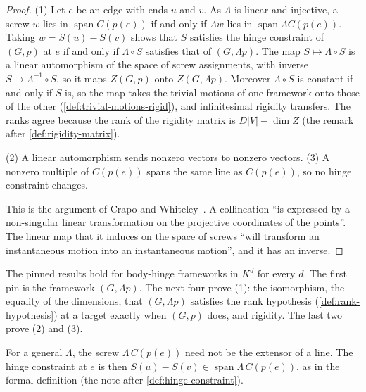 \begin{proof}
  \leanok
  (1) Let $e$ be an edge with ends $u$ and $v$. As $\Lambda$ is linear
  and injective, a screw $w$ lies in $\operatorname{span} C(p(e))$ if
  and only if $\Lambda w$ lies in
  $\operatorname{span} \Lambda C(p(e))$. Taking $w = S(u) - S(v)$
  shows that $S$ satisfies the hinge constraint of $(G, p)$ at $e$ if
  and only if $\Lambda \circ S$ satisfies that of $(G, \Lambda p)$. The
  map $S \mapsto \Lambda \circ S$ is a linear automorphism of the space
  of screw assignments, with inverse $S \mapsto \Lambda^{-1} \circ S$,
  so it maps $Z(G, p)$ onto $Z(G, \Lambda p)$. Moreover $\Lambda \circ S$
  is constant if and only if $S$ is, so the map takes the trivial
  motions of one framework onto those of the other
  (\cref{def:trivial-motions-rigid}), and infinitesimal rigidity
  transfers. The ranks agree because the rank of the rigidity matrix
  is $D|V| - \dim Z$ (the remark after \cref{def:rigidity-matrix}).

  (2) A linear automorphism sends nonzero vectors to nonzero vectors.
  (3) A nonzero multiple of $C(p(e))$ spans the same line as $C(p(e))$,
  so no hinge constraint changes.

  This is the argument of Crapo and
  Whiteley~\cite[\S3.6]{crapoWhiteley1982}. A collineation ``is
  expressed by a non-singular linear transformation on the projective
  coordinates of the points''. The linear map that it induces on the
  space of screws ``will transform an instantaneous motion into an
  instantaneous motion'', and it has an inverse.
\end{proof}

\begin{fmlnote}
  The pinned results hold for body-hinge frameworks in $K^d$ for every
  $d$. The first pin is the framework $(G, \Lambda p)$. The next four
  prove (1): the isomorphism, the equality of the dimensions, that
  $(G, \Lambda p)$ satisfies the rank hypothesis
  (\cref{def:rank-hypothesis}) at a target exactly when $(G, p)$ does,
  and rigidity. The last two prove (2) and (3).
\end{fmlnote}

For a general $\Lambda$, the screw $\Lambda\, C(p(e))$ need not be the
extensor of a line. The hinge constraint at $e$ is then
$S(u) - S(v) \in \operatorname{span} \Lambda\, C(p(e))$, as in the
formal definition (the note after \cref{def:hinge-constraint}).

